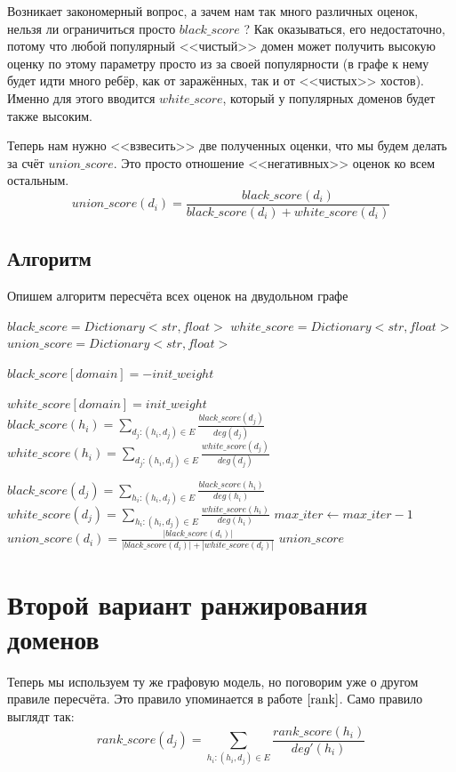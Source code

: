\documentclass[14pt]{extreport}
\begin{document}
	Возникает закономерный вопрос, а зачем нам так много различных оценок, нельзя ли ограничиться просто $black\_score$ ? Как оказываться, его недостаточно, потому что любой популярный <<чистый>> домен может получить высокую оценку по этому параметру просто из за своей популярности (в графе к нему будет идти много ребёр, как от заражённых, так и от <<чистых>> хостов). Именно для этого вводится $white\_score$, который у популярных доменов будет также высоким.
	
	Теперь нам нужно <<взвесить>> две полученных оценки, что мы будем делать за счёт $union\_score$. Это просто отношение <<негативных>> оценок ко всем остальным.
	\begin{equation}
	\label{eq:dr1-union}
	union\_score(d_i) = \frac{black\_score(d_i)}{black\_score(d_i) + white\_score(d_i)}
	\end{equation}
	
	\subsection{Алгоритм}
	Опишем алгоритм пересчёта всех оценок на двудольном графе
	\begin{algorithmic}
	\State $black\_score = Dictionary<str, float>$
	\State $white\_score = Dictionary<str, float>$
	\State $union\_score = Dictionary<str, float>$
	
	
		\State $black\_score[domain] = -init\_weight$
	\EndFor
	
		\State $white\_score[domain] = init\_weight$
	\EndFor
			\State $black\_score(h_i) = \sum_{d_j: (h_i, d_j)\in E} \frac{black\_score(d_j)}{deg(d_j)}$
			\State $white\_score(h_i) = \sum_{d_j: (h_i, d_j)\in E} \frac{white\_score(d_j)}{deg(d_j)}$
		\EndFor
		
			\State $black\_score(d_j) = \sum_{h_i: (h_i, d_j)\in E} \frac{black\_score(h_i)}{deg(h_i)}$
			\State $white\_score(d_j) = \sum_{h_i: (h_i, d_j)\in E} \frac{white\_score(h_i)}{deg(h_i)}$
		\EndFor
		\State $max\_iter\gets max\_iter-1$
	\EndWhile
		\State $union\_score(d_i) = \frac{|black\_score(d_i)|}{|black\_score(d_i)| + |white\_score(d_i)|}$
	\EndFor
	\State \Return $union\_score$
	\EndFunction
	\end{algorithmic}
	
	\section{Второй вариант ранжирования доменов}
	Теперь мы используем ту же графовую модель, но поговорим уже о другом правиле пересчёта. Это правило упоминается в работе $\cite{rank}$. Само правило выглядт так:
	\begin{equation}
	\label{eq:dr2-rank}
	rank\_score(d_j) = \sum_{h_i: (h_i, d_j)\in E} \frac{rank\_score(h_i)}{deg'(h_i)}
	\end{equation}
	
\end{document}
